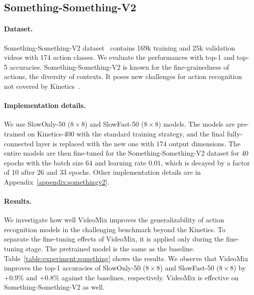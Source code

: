 
\subsection{Something-Something-V2}
\label{section:experiments:something}



\paragraph{Dataset.}
Something-Something-V2 dataset~\cite{goyal2017something} contains 169k training and 25k validation videos with 174 action classes.
We evaluate the performances with top-1 and top-5 accuracies. 
Something-Something-V2 is known for the fine-grainedness of actions, the diversity of contexts. It poses new challenges for action recognition not covered by Kinetics~\cite{kinetics}.

\paragraph{Implementation details.}
We use SlowOnly-50 ($8\times8$) and SlowFast-50 ($8\times8$) models.
The models are pre-trained on Kinetics-400 with the standard training strategy, and the final fully-connected layer is replaced with the new one with $174$ output dimensions. 
The entire models are then fine-tuned for the Something-Something-V2 dataset for $40$ epochs with the batch size $64$ and learning rate $0.01$, which is decayed by a factor of 10 after $26$ and $33$ epochs.
Other implementation details are in Appendix~\ref{appendix:somethingv2}. 

\paragraph{Results.}
We investigate how well VideoMix improves the generalizability of action recognition models in the challenging benchmark beyond the Kinetics.
To separate the fine-tuning effects of VideoMix, it is applied only during the fine-tuning stage. The pretrained model is the same as the baseline. 
Table~\ref{table:experiment:something} shows the results. 
We observe that VideoMix improves the top-1 accuracies of SlowOnly-50 ($8\times8$) and SlowFast-50 ($8\times8$) by $+\mathbf{0.9}\%$ and $+\mathbf{0.8}\%$ against the baselines, respectively. 
VideoMix is effective on Something-Something-V2 as well.